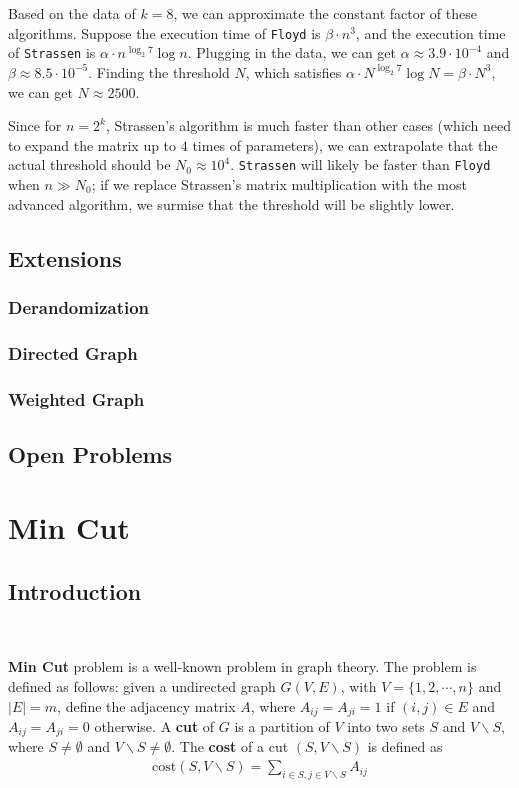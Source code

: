 \documentclass[12pt]{article}
\begin{document}
Based on the data of $k=8$, we can approximate the constant factor of these algorithms. Suppose the execution time of \texttt{Floyd} is $\beta\cdot n^3$, and the execution time of \texttt{Strassen} is $\alpha\cdot n^{\log_2 7}\log n$. Plugging in the data, we can get $\alpha\approx 3.9\cdot 10^{-4}$ and $\beta\approx 8.5\cdot 10^{-5}$. Finding the threshold $N$, which satisfies $\alpha\cdot N^{\log_2 7}\log N=\beta\cdot N^3$, we can get $N\approx 2500$. 

Since for $n=2^k$, Strassen's algorithm is much faster than other cases (which need to expand the matrix up to $4$ times of parameters), we can extrapolate that the actual threshold should be $N_0\approx 10^4$. \texttt{Strassen} will likely be faster than \texttt{Floyd} when $n\gg N_0$; if we replace Strassen's matrix multiplication with the most advanced algorithm, we surmise that the threshold will be slightly lower.

\subsection{Extensions}

\subsubsection{Derandomization}
\subsubsection{Directed Graph}
\subsubsection{Weighted Graph}

\subsection{Open Problems}
\section{Min Cut}

\subsection{Introduction}\

\textbf{Min Cut} problem is a well-known problem in graph theory. The problem is defined as follows: given a  undirected graph $G(V,E)$, with $V=\{1,2,\cdots,n\}$ and $|E|=m$, define the adjacency matrix $A$, where $A_{ij}=A_{ji}=1$ if $(i,j)\in E$ and $A_{ij}=A_{ji}=0$ otherwise. A \textbf{cut} of $G$ is a partition of $V$ into two sets $S$ and $V\backslash S$, where $S\neq\emptyset$ and $V\backslash S\neq\emptyset$. The \textbf{cost} of a cut $(S,V\backslash S)$ is defined as
\begin{align*}
    \text{cost}(S,V\backslash S)=\sum_{i\in S, j\in V\backslash S}A_{ij}
\end{align*}
\end{document}
